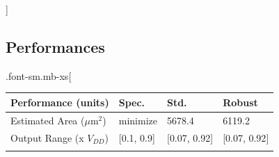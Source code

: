 \documentclass[
]{article}
\begin{document}
{]}

\hypertarget{performances}{%
\subsection{Performances}\label{performances}}

.font-sm.mb-xs{[}

\begin{longtable}[]{@{}llll@{}}
\toprule
\begin{minipage}[b]{0.40\columnwidth}\raggedright
Performance (units)\strut
\end{minipage} & \begin{minipage}[b]{0.16\columnwidth}\raggedright
Spec.\strut
\end{minipage} & \begin{minipage}[b]{0.16\columnwidth}\raggedright
Std.\strut
\end{minipage} & \begin{minipage}[b]{0.16\columnwidth}\raggedright
Robust\strut
\end{minipage}\tabularnewline
\midrule
\endhead
\begin{minipage}[t]{0.40\columnwidth}\raggedright
Estimated Area (\(\mu\)m\(^2\))\strut
\end{minipage} & \begin{minipage}[t]{0.16\columnwidth}\raggedright
minimize\strut
\end{minipage} & \begin{minipage}[t]{0.16\columnwidth}\raggedright
5678.4\strut
\end{minipage} & \begin{minipage}[t]{0.16\columnwidth}\raggedright
6119.2\strut
\end{minipage}\tabularnewline
\begin{minipage}[t]{0.40\columnwidth}\raggedright
Output Range (x \(V_{DD}\))\strut
\end{minipage} & \begin{minipage}[t]{0.16\columnwidth}\raggedright
{[}0.1, 0.9{]}\strut
\end{minipage} & \begin{minipage}[t]{0.16\columnwidth}\raggedright
{[}0.07, 0.92{]}\strut
\end{minipage} & \begin{minipage}[t]{0.16\columnwidth}\raggedright
{[}0.07, 0.92{]}\strut
\end{minipage}\tabularnewline
\begin{minipage}[t]{0.40\columnwidth}\raggedright

\end{minipage}
\end{longtable}
\end{document}
